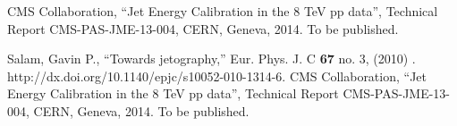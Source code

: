 \begin{thebibliography}{9}


CMS Collaboration, “Jet Energy Calibration in the 8 TeV pp data”, Technical Report CMS-PAS-JME-13-004, CERN, Geneva, 2014. To be published.


Salam, Gavin P., “Towards jetography,” Eur. Phys. J. C \textbf{67} no. 3, (2010) . http://dx.doi.org/10.1140/epjc/s10052-010-1314-6.
CMS Collaboration, “Jet Energy Calibration in the 8 TeV pp data”, Technical Report CMS-PAS-JME-13-004, CERN, Geneva, 2014. To be published.



\end{thebibliography}